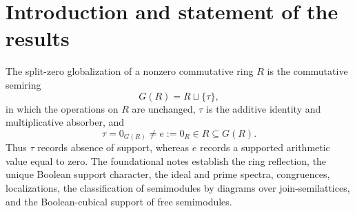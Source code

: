 \documentclass[11pt]{amsart}
\numberwithin{equation}{section}
\theoremstyle{definition}
\begin{document}
\begin{abstract}
For every $n$, the phase group
$\Phi_n=n^{-1}\mathbf Z/\mathbf Z$ carries an explicit nondegenerate
homogeneous quadratic refinement.  Eilenberg--Mac Lane delooping and the
Freed--Hopkins--Lurie--Teleman finite path integral produce an invertible
four-dimensional gerbe theory.  Surface transgression gives the finite
Heisenberg extension with twisted group algebra $M_n(\mathbf C)$, and the
winding-$n$ theta sector of the explicit level-one bundle gerbe on $T^3$
is the same irreducible module, uniquely up to scalar.  Frobenius
multiplication is loop-winding dilation, while denominator divisibility is
encoded by cyclotomic-equivariant Lagrangian correspondences.

A strict matrix model has inductive limit the universal UHF algebra
$\mathcal Q_\Omega$, with
\[
K_0(\mathcal Q_\Omega)\cong(\mathbf Q,\mathbf Q_{\ge0},1),
\qquad
\mathcal D_\Omega\cong C(\widehat{\mathbf Z})
\cong C^*(\mathbf Q/\mathbf Z).
\]
The cyclotomic group acts canonically on the correspondence system and
profinite diagonal, but the naive permutation operators fail to commute
with the standard full-matrix embeddings; the defect is an explicit
crossed carry cocycle.  Thus the Morita-level system is canonical, whereas
a strict lift requires coherent carry trivializations.  Split support also
distinguishes an absent anomalous tier from a defined vanishing amplitude.

The reciprocal-root skeleton retains its Beurling realization and the
estimate $x_{\Lambda_Q}\le d_Q^2$; the remaining density statement is the
classical Nyman--B\'aez-Duarte RH-equivalent endpoint.  No
Scholze-perfectoid identification, fully extended infinite-level TQFT, or
proof of the Riemann hypothesis is asserted.
\end{abstract}

\maketitle
\tableofcontents

\section{Introduction and statement of the results}
\label{sec:introduction}

The split-zero globalization of a nonzero commutative ring $R$ is the
commutative semiring
\[
G(R)=R\sqcup\{\tau\},
\]
in which the operations on $R$ are unchanged, $\tau$ is the additive
identity and multiplicative absorber, and
\[
\tau=0_{G(R)}\neq e:=0_R\in R\subseteq G(R).
\]
Thus $\tau$ records absence of support, whereas $e$ records a supported
arithmetic value equal to zero.  The foundational notes
\cite{Globalization,Secondary} establish the ring reflection, the unique
Boolean support character, the ideal and prime spectra, congruences,
localizations, the classification of semimodules by diagrams over
join-semilattices, and the Boolean-cubical support of free semimodules.
\end{document}
